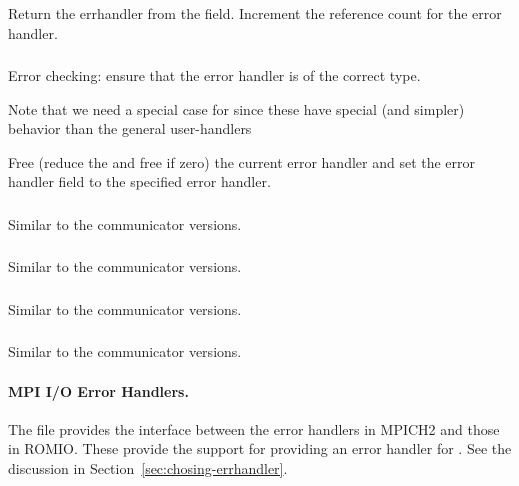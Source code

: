 \documentclass{article}
\begin{document}

\subsubsection{}
Return the errhandler from the  field.  Increment the 
reference count for the error handler.

\subsubsection{}
Error checking: ensure that the error handler is of the correct type.  

Note that we need a special case for  since
these have special (and simpler) behavior than the general user-handlers

Free (reduce the  and free if zero) the current error handler
and set the error handler field to the specified error handler.

\subsubsection{}
Similar to the communicator versions.

\subsubsection{}
Similar to the communicator versions.

\subsubsection{}
Similar to the communicator versions.

\subsubsection{}
Similar to the communicator versions.

\paragraph{MPI I/O Error Handlers.}
The file  provides the
interface between the error handlers in MPICH2 and those in ROMIO.
These provide the support for providing an error handler for
.  See the discussion in
Section~\ref{sec:chosing-errhandler}. 
\end{document}

